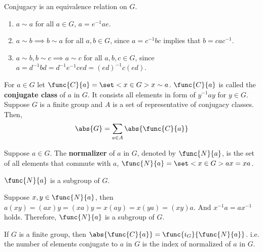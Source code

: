 \begin{lemma}
    Conjugacy is an equivalence relation on \(G\).
\end{lemma}

\begin{prooflemma}
    \begin{enumerate}
        \item \(a \sim a\) for all \(a \in G\), \(a = e^{-1}ae\).
        \item \(a \sim b \implies b \sim a\) for all \(a,b \in G\), since \(a = c^{-1}bc \) implies that \(b = cac^{-1}\).
        \item \(a \sim b, b \sim c \implies a \sim c\) for all \(a,b,c \in G\), since \(a = d^{-1}b d = d^{-1}e^{-1}ced = (ed)^{-1}c(ed)\).
    \end{enumerate}
\end{prooflemma}

For \(a\in G\) let \(\func{C}{a} = \set<x \in G>{x \sim a}\). \(\func{C}{a}\) is called the \textbf{conjugate class} of \(a \) in \(G\). It consists all elements in form of \(y^{-1}ay\) for \(y \in G\). Suppose \(G\) is a finite group and \(A\) is a set of representative of conjugacy classes. Then, 
\begin{equation*}
    \abs{G} = \sum_{a \in A} \abs{\func{C}{a}}
\end{equation*}

\begin{definition}
    Suppose \(a \in G\). The \textbf{normalizer} of \(a\) in \(G\), denoted by \(\func{N}{a}\), is the set of all elements that commute with \(a\), \(\func{N}{a} = \set<x \in G>{ax = xa}\).
\end{definition}

\begin{lemma}
    \(\func{N}{a}\) is a subgroup of \(G\).
\end{lemma}

\begin{prooflemma}
    Suppose \(x,y \in \func{N}{a}\), then \(a(xy) = (ax)y = (xa)y = x(ay) = x(ya) = (xy)a\). And \(x^{-1}a = ax^{-1}\) holds. Therefore, \(\func{N}{a}\) is a subgroup of \(G\).
\end{prooflemma}

\begin{theorem}\label{thm:SizeofConjugacyClass}
    If \(G\) is a finite group, then \(\abs{\func{C}{a}} = \func{i_G}{\func{N}{a}}\). i.e. the number of elements conjugate to \(a\) in \(G\) is the index of normalized of \(a\) in \(G\).
\end{theorem}

